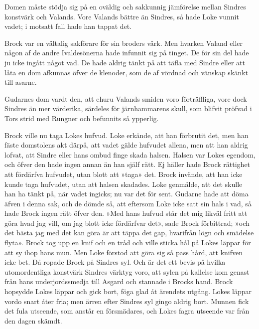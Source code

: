 Domen måste stödja sig på en oväldig och sakkunnig jämförelse mellan
Sindres konstvärk och Valands. Vore
Valands\protect\hypertarget{lb1625905.xhtmlux5cux23start73}{}{}\protect\hypertarget{lb1625905.xhtmlux5cux23start73-a}{}{}\protect\hypertarget{lb1625905.xhtmlux5cux23start73-b}{}{}\protect\hypertarget{lb1625905.xhtmlux5cux23start73-c}{}{}\protect\hypertarget{lb1625905.xhtmlux5cux23start73-d}{}{}
bättre än Sindres, så hade Loke vunnit vadet; i motsatt fall hade han
tappat det.

Brock var en vältalig sakförare för sin broders värk. Men hvarken Valand
eller någon af de andre Ivaldesönerna hade infunnit sig på tinget. De
för sin del hade ju icke ingått något vad. De hade aldrig tänkt på att
täfla med Sindre eller att låta en dom afkunnas öfver de klenoder, som
de af vördnad och vänskap skänkt till asarne.

Gudarnes dom vardt den, att ehuru Valands smiden voro förträffliga, vore
dock Sindres än mer värderika, särdeles för järnhammarens skull, som
blifvit pröfvad i Tors strid med Rungner och befunnits så ypperlig.

Brock ville nu taga Lokes hufvud. Loke erkände, att han förbrutit det,
men han fäste domstolens akt därpå, att vadet gälde hufvudet allena, men
att han aldrig lofvat, att Sindre eller hans ombud finge skada halsen.
Halsen var Lokes egendom, och öfver den hade ingen annan än han själf
rätt. Ej häller hade Brock rättighet att fördärfva hufvudet, utan blott
att »taga» det. Brock invände, att han icke kunde taga hufvudet, utan
att halsen skadades. Loke genmälde, att det skulle han ha tänkt på, när
vadet ingicks; nu var det för sent. Gudarne hade att döma äfven i denna
sak, och de dömde så, att eftersom Loke icke satt sin hals i vad, så
hade Brock ingen rätt öfver den. »Med hans hufvud står det mig likväl
fritt att göra hvad jag vill, om jag blott icke fördärfvar det», sade
Brock förbittrad; »och det bästa jag med det kan göra är att täppa det
gap, hvarifrån lögn och smädelse flyta». Brock tog upp en knif och en
tråd och ville sticka hål på Lokes läppar för att sy ihop hans mun. Men
Loke förstod att göra sig så pass hård, att knifven icke bet. Då ropade
Brock på Sindres syl. Och är det ett bevis på hvilka utomordentliga
konstvärk Sindres värktyg voro, att sylen på kallelse kom genast från
hans underjordssmedja till Asgard och stannade i Brocks hand. Brock
hopsydde Lokes läppar och gick bort, föga glad åt ärendets utgång. Lokes
läppar vordo snart åter fria; men ärren efter Sindres
\protect\hypertarget{lb1625905.xhtmlux5cux23start74}{}{}\protect\hypertarget{lb1625905.xhtmlux5cux23start74-a}{}{}\protect\hypertarget{lb1625905.xhtmlux5cux23start74-b}{}{}\protect\hypertarget{lb1625905.xhtmlux5cux23start74-c}{}{}\protect\hypertarget{lb1625905.xhtmlux5cux23start74-d}{}{}
syl gingo aldrig bort. Munnen fick det fula utseende, som anstår en
försmädares, och Lokes fagra utseende var från den dagen skämdt.

